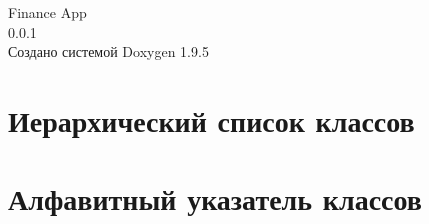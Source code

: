 \documentclass[twoside]{book}
\newcommand{\+}{\discretionary{\mbox{\scriptsize$\hookleftarrow$}}{}{}}
\newcommand{\clearemptydoublepage}{%
    \newpage{\pagestyle{empty}\cleardoublepage}%
  }
\begin{document}
  \raggedbottom
    \hypersetup{pageanchor=false,
                bookmarksnumbered=true,
                pdfencoding=unicode
               }
  \begin{titlepage}
  \vspace*{7cm}
  \begin{center}%
  {\Large Finance App}\\
  [1ex]\large 0.\+0.\+1 \\
  \vspace*{1cm}
  {\large Создано системой Doxygen 1.9.5}\\
  \end{center}
  \end{titlepage}
  \clearemptydoublepage
  \tableofcontents
  \clearemptydoublepage
  \hypersetup{pageanchor=true}
\chapter{Иерархический список классов}

\chapter{Алфавитный указатель классов}

\end{document}
